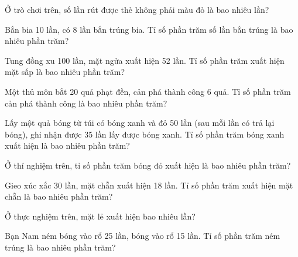 \begin{ex}
  Ở trò chơi trên, số lần rút được thẻ không phải màu đỏ là bao nhiêu lần?
\end{ex}

\begin{ex}
  Bắn bia 10 lần, có 8 lần bắn trúng bia. Tỉ số phần trăm số lần bắn trúng là bao nhiêu phần trăm?
\end{ex}

\begin{ex}
  Tung đồng xu 100 lần, mặt ngửa xuất hiện 52 lần. Tỉ số phần trăm xuất hiện mặt sấp là bao nhiêu phần trăm?
\end{ex}

\begin{ex}
  Một thủ môn bắt 20 quả phạt đền, cản phá thành công 6 quả. Tỉ số phần trăm cản phá thành công là bao nhiêu phần trăm?
\end{ex}

\begin{ex}
  Lấy một quả bóng từ túi có bóng xanh và đỏ 50 lần (sau mỗi lần có trả lại bóng), ghi nhận được 35 lần lấy được bóng xanh. Tỉ số phần trăm bóng xanh xuất hiện là bao nhiêu phần trăm?
\end{ex}

\begin{ex}
  Ở thí nghiệm trên, tỉ số phần trăm bóng đỏ xuất hiện là bao nhiêu phần trăm?
\end{ex}

\begin{ex}
  Gieo xúc xắc 30 lần, mặt chẵn xuất hiện 18 lần. Tỉ số phần trăm xuất hiện mặt chẵn là bao nhiêu phần trăm?
\end{ex}

\begin{ex}
  Ở thực nghiệm trên, mặt lẻ xuất hiện bao nhiêu lần?
\end{ex}

\begin{ex}
  Bạn Nam ném bóng vào rổ 25 lần, bóng vào rổ 15 lần. Tỉ số phần trăm ném trúng là bao nhiêu phần trăm?
\end{ex}

